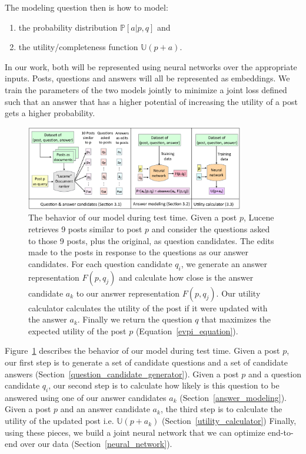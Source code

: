 \documentclass[11pt]{report}
\newcommand{\U}{\mathbb{U}}
\begin{document}
The modeling question then is how to model: 
\begin{enumerate}
\item the probability distribution $\mathbb{P}[a | p,q]$ and
\item the utility/completeness function $\U(p+a)$.
\end{enumerate}
In our work, both will be represented using neural networks over the appropriate inputs. Posts, questions and answers will all be represented as embeddings. We train the parameters of the two models jointly to minimize a joint loss defined such that an answer that has a higher potential of increasing the utility of a post gets a higher probability.

\begin{figure}[t]
\centering
\includegraphics[width=0.85\textwidth]{model}
\caption{\small The behavior of our model during test time. Given a post $p$, Lucene retrieves 9 posts similar to post $p$ and consider the questions asked to those 9 posts, plus the original, as question candidates. The edits made to the posts in response to the questions as our answer candidates. For each question candidate $q_i$, we generate an answer representation $F(p,q_j)$ and calculate how close is the answer candidate $a_k$ to our answer representation $F(p,q_j)$. Our utility calculator calculates the utility of the post if it were updated with the answer $a_k$. Finally we return the question $q$ that maximizes the expected utility of the post $p$ (Equation~\ref{evpi_equation}).}
\label{model}
\end{figure}

Figure~\ref{model} describes the behavior of our model during test time. 
Given a post $p$, our first step is to generate a set of candidate questions and a set of candidate answers (Section~\ref{question_candidate_generator}).
Given a post $p$ and a question candidate $q_i$, our second step is to calculate how likely is this question to be answered using one of our answer candidates $a_k$ (Section~\ref{answer_modeling}).
Given a post $p$ and an answer candidate $a_k$, the third step is to calculate the utility of the updated post i.e. $\U(p + a_k)$ (Section~\ref{utility_calculator})
Finally, using these pieces, we build a joint neural network that we can optimize end-to-end over our data (Section~\ref{neural_network}).
\end{document}
